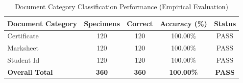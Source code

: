 \begin{table}[htbp]
\caption{Document Category Classification Performance (Empirical Evaluation)}
\label{tab:category_classification}
\centering
\begin{tabular}{lcccc}
\hline
\textbf{Document Category} & \textbf{Specimens} & \textbf{Correct} & \textbf{Accuracy (\%)} & \textbf{Status} \\
\hline
Certificate & 120 & 120 & 100.00\% & PASS \\
Marksheet & 120 & 120 & 100.00\% & PASS \\
Student Id & 120 & 120 & 100.00\% & PASS \\
\hline
\textbf{Overall Total} & \textbf{360} & \textbf{360} & \textbf{100.00\%} & \textbf{PASS} \\
\hline
\end{tabular}
\end{table}

